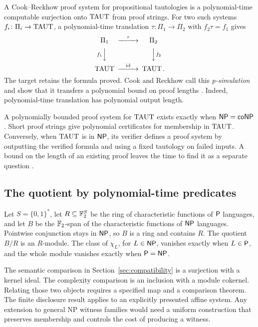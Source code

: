 A Cook--Reckhow proof system for propositional tautologies is a
polynomial-time computable surjection onto \(\operatorname{TAUT}\) from proof strings.
For two such systems \(f_i\colon \Pi_i\to\operatorname{TAUT}\), a polynomial-time
translation \(\tau\colon\Pi_1\to\Pi_2\) with \(f_2\tau=f_1\) gives
\begin{equation}\label{eq:proof-translation}
\begin{CD}
  \Pi_1 @>{\tau}>> \Pi_2\\
  @V{f_1}VV @VV{f_2}V\\
  \TAUT @>{\mathrm{id}}>> \TAUT .
\end{CD}
\end{equation}
The target retains the formula proved. Cook and Reckhow call this
\emph{p-simulation} and show that it transfers a polynomial bound on
proof lengths \cite[Definitions 1.3 and 1.5, Proposition 1.6]{cookreckhow}.
Indeed, polynomial-time translation has polynomial output length.

A polynomially bounded proof system for \(\operatorname{TAUT}\) exists exactly when
\(\mathsf{NP}=\mathsf{coNP}\). Short proof strings give polynomial certificates for
membership in \(\operatorname{TAUT}\). Conversely, when \(\operatorname{TAUT}\) is in \(\mathsf{NP}\), its
verifier defines a proof system by outputting the verified formula and
using a fixed tautology on failed inputs. A bound on the length of an
existing proof leaves the time to find it as a separate question
\cite{cookreckhow}.

\subsection{The quotient by polynomial-time predicates}

Let \(S=\{0,1\}^{*}\), let \(R\subseteq\mathbb F_2^S\) be the ring of
characteristic functions of \(\mathsf{P}\) languages, and let \(B\) be the
\(\mathbb F_2\)-span of the characteristic functions of \(\mathsf{NP}\) languages.
Pointwise conjunction stays in \(\mathsf{NP}\), so \(B\) is a ring and contains
\(R\). The quotient \(B/R\) is an \(R\)-module. The class of
\(\chi_L\), for \(L\in\mathsf{NP}\), vanishes exactly when \(L\in\mathsf{P}\), and the
whole module vanishes exactly when \(\mathsf{P}=\mathsf{NP}\).

The semantic comparison in Section~\ref{sec:compatibility} is a
surjection with a kernel ideal. The complexity comparison is an
inclusion with a module cokernel. Relating those two objects requires
a specified map and a comparison theorem. The finite disclosure result
applies to an explicitly presented affine system. Any extension to
general NP witness families would need a uniform construction that
preserves membership and controls the cost of producing a witness.
